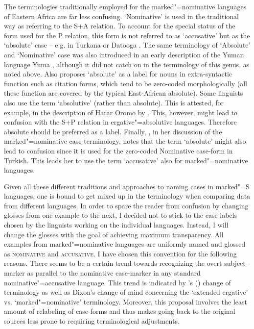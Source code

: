 The terminologies traditionally employed for the marked"=nominative languages of Eastern Africa are far less confusing. 
`Nominative' is used in the traditional way as referring to the S+A relation. 
To account for the special status of the form used for the P relation, this form is not referred to as `accusative' but as the `absolute' case -- e.g. in Turkana \citep{Dimmendaal:1982} or Datooga \citep{Kiessling:2007}. 
The same terminology of `Absolute' and `Nominative' case was also introduced in an early description of the Yuman language Yuma \citep[210]{HalpernYuma3}, although it did not catch on in the terminology of this genus, as noted above. 
Also \citet[456]{Creissels:2009} proposes `absolute' as a label for nouns in extra-syntactic function such as citation forms, which tend to be zero-coded morphologically (all these function are covered by the typical East-African absolute).
Some linguists also use the term `absolutive' (rather than absolute). 
This is attested, for example, in the description of Harar Oromo by \citet{Owens:1985}. 
This, however, might lead to confusion with the S+P relation in ergative"=absolutive languages. 
Therefore absolute should be preferred as a label. 
Finally, \citet[24]{Koenig:2008}, in her discussion of the marked"=nominative case-terminology, notes that the term `absolute' might also lead to confusion since it is used for the zero-coded Nominative case-form in Turkish. 
This leads her to use the term `accusative' also for marked"=nominative languages. 

Given all these different traditions and approaches to naming cases in marked"=S languages, one is bound to get mixed up in the terminology when comparing data from different languages. 
In order to spare the reader from confusion by changing glosses from one example to the next, I decided not to stick to the case-labels chosen by the linguists working on the individual languages. 
Instead, I will change the glosses with the goal of achieving maximum transparency. 
All examples from marked"=nominative languages are uniformly named and glossed as \textsc{nominative} and \textsc{accusative}. 
I have chosen this convention for the following reasons.
There seems to be a certain trend towards recognizing the overt subject-marker as parallel to the nominative case-marker in any standard nominative"=accusative language. 
This trend is indicated by \citeauthor{Thompsonetal:2006}'s (\citeyear{Thompsonetal:2006}) change of terminology as well as Dixon's change of mind concerning the `extended ergative' vs. `marked"=nominative' terminology. 
Moreover, this proposal involves the least amount of relabeling of case-forms and thus makes going back to the original sources less prone to requiring terminological adjustments. 

